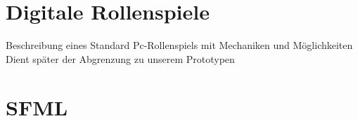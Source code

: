 \section{Digitale Rollenspiele}
\label{sec:DigitaleRollenspiele}

Beschreibung eines Standard Pc-Rollenspiels mit Mechaniken und Möglichkeiten\newline
Dient später der Abgrenzung zu unserem Prototypen


\section{SFML}
\label{sec:SFML}
